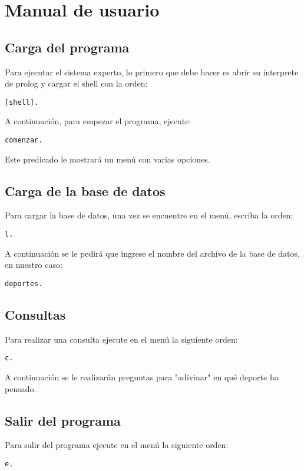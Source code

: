 \chapter{Manual de usuario}
\section{Carga del programa}
Para ejecutar el sistema experto, lo primero que debe hacer es abrir su interprete
de prolog y cargar el shell con la orden:

\texttt{[shell].}

A continuación, para empezar el programa, ejecute:

\texttt{comenzar.}

Este predicado le mostrará un menú con varias opciones.

\section{Carga de la base de datos}
Para cargar la base de datos, una vez se encuentre en el menú, escriba la orden:

\texttt{l.}

A continuación se le pedirá que ingrese el nombre del archivo de la base de datos,
en nuestro caso:

\texttt{deportes.}

\section{Consultas}
Para realizar una consulta ejecute en el menú la siguiente orden:

\texttt{c.}

A continuación se le realizarán preguntas para "adivinar" en qué deporte ha pensado.

\section{Salir del programa}

Para salir del programa ejecute en el menú la siguiente orden:

\texttt{e.}
